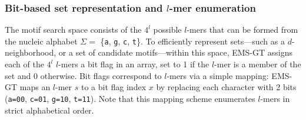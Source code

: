 \documentclass[oneside,12pt]{DISCSthesis}
\begin{document}
		\subsubsection{Bit-based set representation and $l$-mer enumeration}
			The motif search space consists of the $4^{l}$ possible $l$-mers that can be formed from the nucleic alphabet $\Sigma=$ \{\texttt{a}, \texttt{g}, \texttt{c}, \texttt{t}\}. To efficiently represent sets---such as a $d$-neighborhood, or a set of candidate motifs---within this space, EMS-GT assigns each of the $4^{l}$ $l$-mers a bit flag in an array, set to 1 if the $l$-mer is a member of the set and 0 otherwise. Bit flags correspond to $l$-mers via a simple mapping: EMS-GT maps an $l$-mer $s$ to a bit flag index $x$ by replacing each character with 2 bits (\texttt{a=00}, \texttt{c=01}, \texttt{g=10}, \texttt{t=11}). Note that this mapping scheme enumerates $l$-mers in strict alphabetical order.
\end{document}
